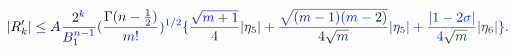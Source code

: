 \documentclass[12pt]{article}
\begin{document}
\makeatletter
\renewcommand*{\@textcolor}[3]{%
  \protect\leavevmode
  \begingroup
    \color#1{#2}#3%
  \endgroup
}
\makeatother
\begin{displaymath}
\mathcolor[RGB]{0,0,15}{|} \mathcolor[RGB]{0,0,30}{R} _ { \mathcolor[RGB]{0,0,45}{k} } ^ { \mathcolor[RGB]{0,0,60}{\prime} } \mathcolor[RGB]{0,0,75}{|} \mathcolor[RGB]{0,0,90}{\leq} \mathcolor[RGB]{0,0,105}{A} \mathcolor[RGB]{0,0,120}{\frac { \mathcolor[RGB]{0,0,135}{2} ^ { \mathcolor[RGB]{0,0,150}{k} } } { \mathcolor[RGB]{0,0,165}{B} _ { \mathcolor[RGB]{0,0,180}{1} } ^ { \mathcolor[RGB]{0,0,195}{n} \mathcolor[RGB]{0,0,210}{-} \mathcolor[RGB]{0,0,225}{1} } } } \mathcolor[RGB]{0,0,240}{(} \mathcolor[RGB]{0,0,255}{\frac { \mathcolor[RGB]{0,15,0}{\Gamma} \mathcolor[RGB]{0,15,15}{(} \mathcolor[RGB]{0,15,30}{n} \mathcolor[RGB]{0,15,45}{-} \mathcolor[RGB]{0,15,60}{\frac { \mathcolor[RGB]{0,15,75}{1} } { \mathcolor[RGB]{0,15,90}{2} } } \mathcolor[RGB]{0,15,105}{)} } { \mathcolor[RGB]{0,15,120}{m} \mathcolor[RGB]{0,15,135}{!} } } \mathcolor[RGB]{0,15,150}{)} ^ { \mathcolor[RGB]{0,15,165}{1} \mathcolor[RGB]{0,15,180}{/} \mathcolor[RGB]{0,15,195}{2} } \mathcolor[RGB]{0,15,210}{\{} \mathcolor[RGB]{0,15,225}{\frac { \mathcolor[RGB]{0,15,240}{\sqrt { \mathcolor[RGB]{0,15,255}{m} \mathcolor[RGB]{0,30,0}{+} \mathcolor[RGB]{0,30,15}{1} } } } { \mathcolor[RGB]{0,30,30}{4} } } \mathcolor[RGB]{0,30,45}{\vert} \mathcolor[RGB]{0,30,60}{\eta} _ { \mathcolor[RGB]{0,30,75}{5} } \mathcolor[RGB]{0,30,90}{\vert} \mathcolor[RGB]{0,30,105}{+} \mathcolor[RGB]{0,30,120}{\frac { \mathcolor[RGB]{0,30,135}{\sqrt { \mathcolor[RGB]{0,30,150}{(} \mathcolor[RGB]{0,30,165}{m} \mathcolor[RGB]{0,30,180}{-} \mathcolor[RGB]{0,30,195}{1} \mathcolor[RGB]{0,30,210}{)} \mathcolor[RGB]{0,30,225}{(} \mathcolor[RGB]{0,30,240}{m} \mathcolor[RGB]{0,30,255}{-} \mathcolor[RGB]{0,45,0}{2} \mathcolor[RGB]{0,45,15}{)} } } } { \mathcolor[RGB]{0,45,30}{4} \mathcolor[RGB]{0,45,45}{\sqrt { \mathcolor[RGB]{0,45,60}{m} } } } } \mathcolor[RGB]{0,45,75}{\vert} \mathcolor[RGB]{0,45,90}{\eta} _ { \mathcolor[RGB]{0,45,105}{5} } \mathcolor[RGB]{0,45,120}{\vert} \mathcolor[RGB]{0,45,135}{+} \mathcolor[RGB]{0,45,150}{\frac { \mathcolor[RGB]{0,45,165}{\vert} \mathcolor[RGB]{0,45,180}{1} \mathcolor[RGB]{0,45,195}{-} \mathcolor[RGB]{0,45,210}{2} \mathcolor[RGB]{0,45,225}{\sigma} \mathcolor[RGB]{0,45,240}{\vert} } { \mathcolor[RGB]{0,45,255}{4} \mathcolor[RGB]{0,60,0}{\sqrt { \mathcolor[RGB]{0,60,15}{m} } } } } \mathcolor[RGB]{0,60,30}{\vert} \mathcolor[RGB]{0,60,45}{\eta} _ { \mathcolor[RGB]{0,60,60}{6} } \mathcolor[RGB]{0,60,75}{\vert} \mathcolor[RGB]{0,60,90}{\}} \mathcolor[RGB]{0,60,105}{.}
\end{displaymath}
\end{document}
